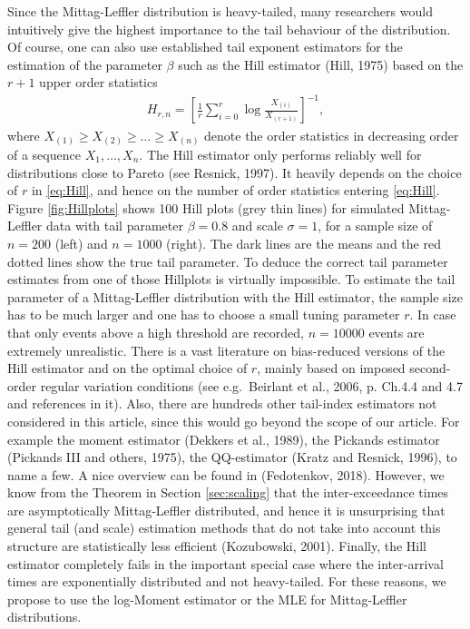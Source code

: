 \documentclass[]{elsarticle} %
\begin{document}
Since the Mittag-Leffler distribution is heavy-tailed, many researchers
would intuitively give the highest importance to the tail behaviour of
the distribution. Of course, one can also use established tail exponent
estimators for the estimation of the parameter \(\beta\) such as the
Hill estimator (Hill, 1975) based on the \(r+1\) upper order statistics
\begin{align}\label{eq:Hill}
H_{r,n}=\left[ \frac{1}{r} \sum_{i=0}^{r} \log \frac{X_{(i)}}{X_{(r+1)}}\right]^{-1}, 
\end{align} where \(X_{(1)} \geq X_{(2)} \geq \ldots \geq X_{(n)}\)
denote the order statistics in decreasing order of a sequence
\(X_1,\ldots,X_n\). The Hill estimator only performs reliably well for
distributions close to Pareto (see Resnick, 1997). It heavily depends on
the choice of \(r\) in \eqref{eq:Hill}, and hence on the number of order
statistics entering \eqref{eq:Hill}. Figure \ref{fig:Hillplots} shows
100 Hill plots (grey thin lines) for simulated Mittag-Leffler data with
tail parameter \(\beta=0.8\) and scale \(\sigma=1\), for a sample size
of \(n=200\) (left) and \(n=1000\) (right). The dark lines are the means
and the red dotted lines show the true tail parameter. To deduce the
correct tail parameter estimates from one of those Hillplots is
virtually impossible. To estimate the tail parameter of a Mittag-Leffler
distribution with the Hill estimator, the sample size has to be much
larger and one has to choose a small tuning parameter \(r\). In case
that only events above a high threshold are recorded, \(n=10000\) events
are extremely unrealistic. There is a vast literature on bias-reduced
versions of the Hill estimator and on the optimal choice of \(r\),
mainly based on imposed second-order regular variation conditions (see
e.g.~Beirlant et al., 2006, p. Ch.4.4 and 4.7 and references in it).
Also, there are hundreds other tail-index estimators not considered in
this article, since this would go beyond the scope of our article. For
example the moment estimator (Dekkers et al., 1989), the Pickands
estimator (Pickands III and others, 1975), the QQ-estimator (Kratz and
Resnick, 1996), to name a few. A nice overview can be found in
(Fedotenkov, 2018). However, we know from the Theorem in Section
\ref{sec:scaling} that the inter-exceedance times are asymptotically
Mittag-Leffler distributed, and hence it is unsurprising that general
tail (and scale) estimation methods that do not take into account this
structure are statistically less efficient (Kozubowski, 2001). Finally,
the Hill estimator completely fails in the important special case where
the inter-arrival times are exponentially distributed and not
heavy-tailed. For these reasons, we propose to use the log-Moment
estimator or the MLE for Mittag-Leffler distributions.
\end{document}
